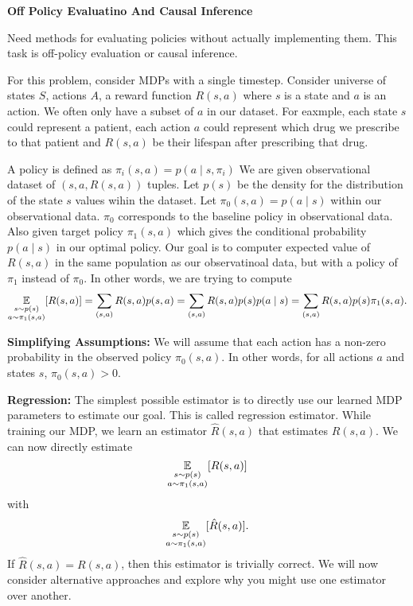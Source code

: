\documentclass[12pt,letterpaper,boxed]{hmcpset}
\begin{document}
\begin{problem}[Problem 2]
  \textbf{Off Policy Evaluatino And Causal Inference}

  Need methods for evaluating policies without actually implementing them. This task is off-policy evaluation or causal inference.

  For this problem, consider MDPs with a single timestep. Consider universe of states $S$, actions $A$, a reward function $R(s, a)$ where $s$ is a state and $a$ is an action. We often only have a subset of $a$ in our dataset. For eaxmple, each state $s$ could represent a patient, each action $a$ could represent which drug we prescribe to that patient and $R(s, a)$ be their lifespan after prescribing that drug.

  A policy is defined as $\pi_i (s, a) = p(a \mid s, \pi_i)$ We are given observational dataset of $(s, a, R(s, a))$ tuples. Let $p(s)$ be the density for the distribution of the state $s$ values wihin the dataset. Let $\pi_0 (s, a) = p(a \mid s)$ within our observational data. $\pi_0$ corresponds to the baseline policy in observational data. Also given target policy $\pi_1 (s,a)$ which gives the conditional probability $p(a \mid s)$ in our optimal policy. Our goal is to computer expected value of $R(s,a)$ in the same population as our observatinoal data, but with a policy of $\pi_1$ instead of $\pi_0$. In other words, we are trying to compute
  \[
  \operatorname*{\mathbb{E}}_{\substack{s \sim p(s) \\ a \sim \pi_1(s,a)}} [R(s, a)] = \sum_{(s,a)} R(s,a) p(s,a) = \sum_{(s,a)} R(s,a) p(s) p(a \mid s) = \sum_{(s,a)} R(s,a) p(s) \pi_1 (s,a).
  \]

  \textbf{Simplifying Assumptions: } We will assume that each action has a non-zero probability in the observed policy $\pi_0 (s, a)$. In other words, for all actions $a$ and states $s$, $\pi_0 (s,a) > 0$.

  \textbf{Regression:} The simplest possible estimator is to directly use our learned MDP parameters to estimate our goal. This is called regression estimator. While training our MDP, we learn an estimator $\hat R(s,a)$ that estimates $R(s,a)$. We can now directly estimate
  \[
  \operatorname*{\mathbb{E}}_{\substack{s \sim p(s) \\ a \sim \pi_1(s,a)}} [R(s, a)]
  \]
  with 
  \[
    \operatorname*{\mathbb{E}}_{\substack{s \sim p(s) \\ a \sim \pi_1(s,a)}} [\hat R(s, a)].
  \]
  If $\hat R(s,a) = R(s,a)$, then this estimator is trivially correct. We will now consider alternative approaches and explore why you might use one estimator over another.
\end{problem}
\end{document}
